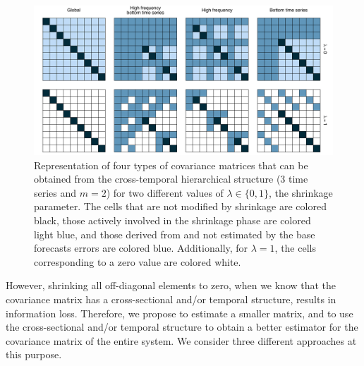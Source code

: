 \documentclass[a4paper,11pt]{article}
\theoremstyle{definition}
\begin{document}
\begin{figure}[!b]
	\centering
	\includegraphics[width = \linewidth]{fig/shr_cov/shr_color.pdf}
	\caption{Representation of four types of covariance matrices that can be obtained from the cross-temporal hierarchical structure ($3$ time series and $m = 2$) for two different values of $\lambda\in\{0,1\}$, the shrinkage parameter. The cells that are not modified by shrinkage are colored black, those actively involved in the shrinkage phase are colored light blue, and those derived from and not estimated by the base forecasts errors are colored blue. Additionally, for $\lambda = 1$, the cells corresponding to a zero value are colored white.}
	\label{fig:shr_grid}
\end{figure}

However, shrinking all off-diagonal elements to zero, when we know that the covariance matrix has a cross-sectional and/or temporal structure, results in information loss. Therefore, we propose to estimate a smaller matrix, and to use the cross-sectional and/or temporal structure to obtain a better estimator for the covariance matrix of the entire system. We consider three different approaches at this purpose.
\end{document}
